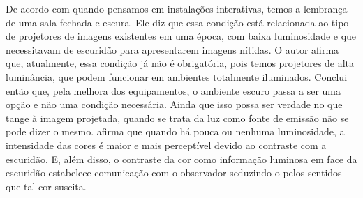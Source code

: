 De acordo com  quando pensamos em instalações interativas, temos a lembrança de uma sala fechada e escura. Ele diz que essa condição está relacionada ao tipo de projetores de imagens existentes em uma época, com baixa luminosidade e que necessitavam de escuridão para apresentarem imagens nítidas. O autor afirma que, atualmente, essa condição já não é obrigatória, pois temos projetores de alta luminância, que podem funcionar em ambientes totalmente iluminados. Conclui então que, pela melhora dos equipamentos, o ambiente escuro passa a ser uma opção e não uma condição necessária. Ainda que isso possa ser verdade no que tange à imagem projetada, quando se trata da luz como fonte de emissão não se pode dizer o mesmo.  afirma que quando há pouca ou nenhuma luminosidade, a intensidade das cores é maior e mais perceptível devido ao contraste com a escuridão. E, além disso, o contraste da cor como informação luminosa em face da escuridão estabelece comunicação com o observador seduzindo-o pelos sentidos que tal cor suscita.


